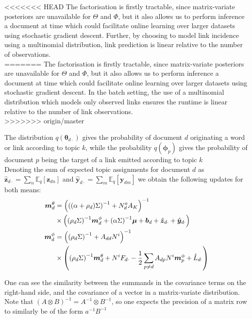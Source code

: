 \documentclass{sciposter}
\newcommand \ex[2] {
    \mathbb{E}_{ { #2 } }\left[ #1 \right]
}
\newcommand \halve[1] {
	\frac{#1}{2}
}
\newcommand \half {
    \halve{1}
}
\newcommand \vv[1] { \bm #1 }
\newcommand \inv[1] { {#1}^{-1} }
\newcommand \invb[1] { \inv{\left( #1 \right)} }
\newcommand \thdo { { \vv{\theta}_{d\cdot} } }
\begin{document}
\begin{multicols}{3}
<<<<<<< HEAD
The factorisation is firstly tractable, since matrix-variate posteriors are unavailable for $\Theta$ and $\Phi$, but it also allows us to perform inference a document at time which could facilitate online learning over larger datasets using stochastic gradient descent. Further, by choosing to model link incidence using a multinomial distribution, link prediction is linear relative to the number of observations.  \\
=======
The factorisation is firstly tractable, since matrix-variate posteriors are unavailable for $\Theta$ and $\Phi$, but it also allows us to perform inference a document at time which could facilitate online learning over larger datasets using stochastic gradient descent. In the batch setting, the use of a multinomial distribution which models only observed links ensures the runtime is linear relative to the number of link observations.  \\
>>>>>>> origin/master

The distribution $q(\thdo)$ gives the probability of document $d$ originating a word or link according to topic $k$, while the probability $q(\vv{\phi}_p)$ gives the probability of document $p$ being the target of a link emitted according to topic $k$\\

Denoting the sum of expected topic assignments for document $d$ as $\hat{\vv{z}}_{d\cdot} = \sum_n \ex{\vv{z}_{dn}}{q}$ and $\hat{\vv{y}}_{d\cdot} = \sum_m \ex{\vv{y}_{dm}}{q}$ we obtain the following updates for both means:
\begin{align*}
\mtd &= \invb{ \invb{(\alpha + \rho_d)\Sigma} + N^o_d A_K } \\
    & \times
            \left(
                \invb{\rho_d \Sigma} \mpd
                + \invb{\alpha \Sigma}\vv{\mu}
                + \vv{b}_d 
                + \hat{\vv{z}}_{d\cdot}
                + \hat{\vv{y}}_{d\cdot}
            \right) \\
 \mpd & = \invb{\invb{\rho_d \Sigma} + A_{dd}N^i} \\
  & \times
             \left(
                 \invb{\rho_d \Sigma}\mtd + N^i F_{d\cdot} -\half \sum_{p \neq d} A_{dp} N^i \vv{m}^\phi_p + \hat{L}_{d\cdot}
             \right)
 \end{align*}
 
One can see the similarity between the summands in the covariance terms on the right-hand side, and the covariance of a vector in a matrix-variate distribution. Note that $\invb{A\otimes B} = \inv{A} \otimes \inv{B}$, so one expects the precision of a matrix row to similarly be of the form $\inv{a}\inv{B}$


\end{multicols}
\end{document}
